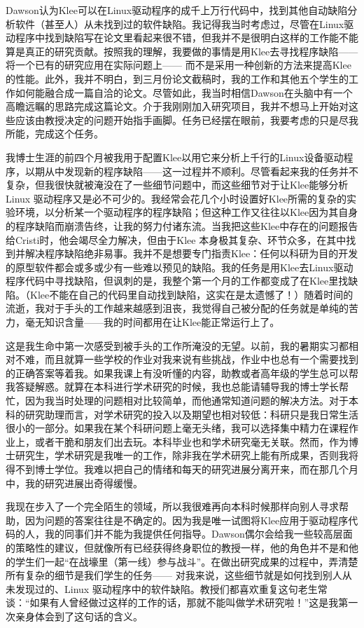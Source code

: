 \documentclass[12pt,UTF8,nofonts]{book}
\begin{document}
Dawson认为Klee可以在Linux驱动程序的成千上万行代码中，找到其他自动缺陷分析软件（甚至人）从未找到过的软件缺陷。我记得我当时考虑过，尽管在Linux驱动程序中找到缺陷写在论文里看起来很不错，但我并不是很明白这样的工作能不能算是真正的研究贡献。按照我的理解，我要做的事情是用Klee去寻找程序缺陷—— 将一个已有的研究应用在实际问题上—— 而不是采用一种创新的方法来提高Klee的性能。此外，我并不明白，到三月份论文截稿时，我的工作和其他五个学生的工作如何能融合成一篇自洽的论文。尽管如此，我当时相信Dawson在头脑中有一个高瞻远瞩的思路完成这篇论文。介于我刚刚加入研究项目，我并不想马上开始对这些应该由教授决定的问题开始指手画脚。任务已经摆在眼前，我要考虑的只是尽我所能，完成这个任务。

\breakline

我博士生涯的前四个月被我用于配置Klee以用它来分析上千行的Linux设备驱动程序，以期从中发现新的程序缺陷——这一过程并不顺利。尽管看起来我的任务并不复杂，但我很快就被淹没在了一些细节问题中，而这些细节对于让Klee能够分析Linux 驱动程序又是必不可少的。我经常会花几个小时设置好Klee所需的复杂的实验环境，以分析某一个驱动程序的程序缺陷；但这种工作又往往以Klee因为其自身的程序缺陷而崩溃告终，让我的努力付诸东流。当我把这些Klee中存在的问题报告给Cristi时，他会竭尽全力解决，但由于Klee 本身极其复杂、环节众多，在其中找到并解决程序缺陷绝非易事。我并不是想要专门指责Klee：任何以科研为目的开发的原型软件都会或多或少有一些难以预见的缺陷。我的任务是用Klee去Linux驱动程序代码中寻找缺陷，但讽刺的是，我整个第一个月的工作都变成了在Klee里找缺陷。（Klee不能在自己的代码里自动找到缺陷，这实在是太遗憾了！）随着时间的流逝，我对于手头的工作越来越感到沮丧，我觉得自己被分配的任务就是单纯的苦力，毫无知识含量——我的时间都用在让Klee能正常运行上了。

这是我生命中第一次感受到被手头的工作所淹没的无望。以前，我的暑期实习都相对不难，而且就算一些学校的作业对我来说有些挑战，作业中也总有一个需要找到的正确答案等着我。如果我课上有没听懂的内容，助教或者高年级的学生总可以帮我答疑解惑。就算在本科进行学术研究的时候，我也总能请辅导我的博士学长帮忙，因为我当时处理的问题相对比较简单，而他通常知道问题的解决方法。对于本科的研究助理而言，对学术研究的投入以及期望也相对较低：科研只是我日常生活很小的一部分。如果我在某个科研问题上毫无头绪，我可以选择集中精力在课程作业上，或者干脆和朋友们出去玩。本科毕业也和学术研究毫无关联。然而，作为博士研究生，学术研究是我唯一的工作，除非我在学术研究上能有所成果，否则我将得不到博士学位。我难以把自己的情绪和每天的研究进展分离开来，而在那几个月中，我的研究进展出奇得缓慢。

我现在步入了一个完全陌生的领域，所以我很难再向本科时候那样向别人寻求帮助，因为问题的答案往往是不确定的。因为我是唯一试图将Klee应用于驱动程序代码的人，我的同事们并不能为我提供任何指导。Dawson偶尔会给我一些较高层面的策略性的建议，但就像所有已经获得终身职位的教授一样，他的角色并不是和他的学生们一起“在战壕里（第一线）参与战斗”。在做出研究成果的过程中，弄清楚所有复杂的细节是我们学生的任务—— 对我来说，这些细节就是如何找到别人从未发现过的、Linux 驱动程序中的软件缺陷。教授们都喜欢重复这句老生常谈：“如果有人曾经做过这样的工作的话，那就不能叫做学术研究啦！”这是我第一次亲身体会到了这句话的含义。
\end{document}
